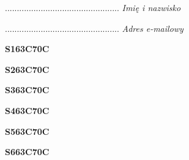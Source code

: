\begin{turn}{90}\begin{minipage}{\linewidth} \vspace{20mm} ................................................  \textit{Imię i nazwisko}\end{minipage}\end{turn}

\begin{turn}{90}\begin{minipage}{\linewidth} \vspace{20mm} ................................................  \textit{Adres e-mailowy}\end{minipage}\end{turn}

\begin{turn}{90}\huge \begin{minipage}{\linewidth} \vspace{10mm}\textbf{S163C70C}\end{minipage}\end{turn}

\begin{turn}{90}\huge \begin{minipage}{\linewidth} \vspace{10mm}\textbf{S263C70C}\end{minipage}\end{turn}

\begin{turn}{90}\huge \begin{minipage}{\linewidth} \vspace{10mm}\textbf{S363C70C}\end{minipage}\end{turn}

\begin{turn}{90}\huge \begin{minipage}{\linewidth} \vspace{10mm}\textbf{S463C70C}\end{minipage}\end{turn}

\begin{turn}{90}\huge \begin{minipage}{\linewidth} \vspace{10mm}\textbf{S563C70C}\end{minipage}\end{turn}

\begin{turn}{90}\huge \begin{minipage}{\linewidth} \vspace{10mm}\textbf{S663C70C}\end{minipage}\end{turn}

